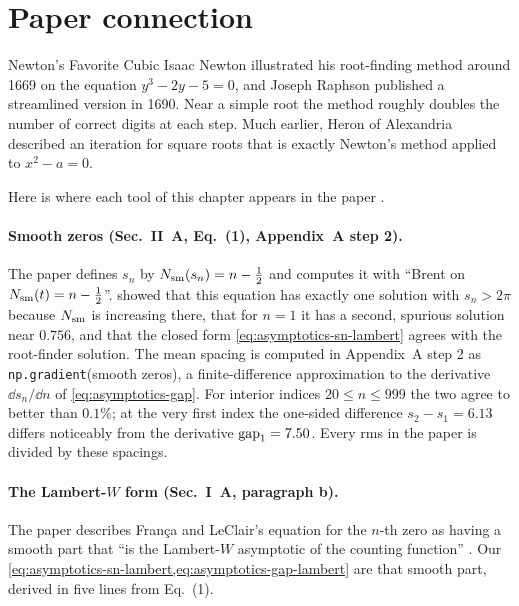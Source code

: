 \section{Paper connection}\label{sec:asymptotics-paper}
\begin{didyouknow}{Newton's Favorite Cubic}
Isaac Newton illustrated his root-finding method around 1669 on the equation $y^3-2y-5=0$, and Joseph Raphson published a streamlined version in 1690. Near a simple root the method roughly doubles the number of correct digits at each step. Much earlier, Heron of Alexandria described an iteration for square roots that is exactly Newton's method applied to $x^2-a=0$.
\end{didyouknow}

Here is where each tool of this chapter appears in the paper \cite{soniR1}.

\paragraph{Smooth zeros (Sec.~II~A, Eq.~(1), Appendix~A step 2).} The paper defines $s_n$ by $N_{\mathrm{sm}}(s_n)=n-\tfrac12$ and computes it with ``Brent on $N_{\mathrm{sm}}(t)=n-\tfrac12$''.  showed that this equation has exactly one solution with $s_n>2\pi$ because $N_{\mathrm{sm}}$ is increasing there, that for $n=1$ it has a second, spurious solution near $0.756$, and that the closed form \cref{eq:asymptotics-sn-lambert} agrees with the root-finder solution. The mean spacing is computed in Appendix~A step 2 as \texttt{np.gradient}(smooth zeros), a finite-difference approximation to the derivative $\dd s_n/\dd n$ of \cref{eq:asymptotics-gap}. For interior indices $20\le n\le999$ the two agree to better than $0.1\%$; at the very first index the one-sided difference $s_2-s_1=6.13$ differs noticeably from the derivative $\mathrm{gap}_1=7.50$. Every rms in the paper is divided by these spacings.

\paragraph{The Lambert-$W$ form (Sec.~I~A, paragraph b).} The paper describes Fran\c ca and LeClair's equation for the $n$-th zero as having a smooth part that ``is the Lambert-$W$ asymptotic of the counting function'' \cite{francaleclair,leclair}. Our \cref{eq:asymptotics-sn-lambert,eq:asymptotics-gap-lambert} are that smooth part, derived in five lines from Eq.~(1).

